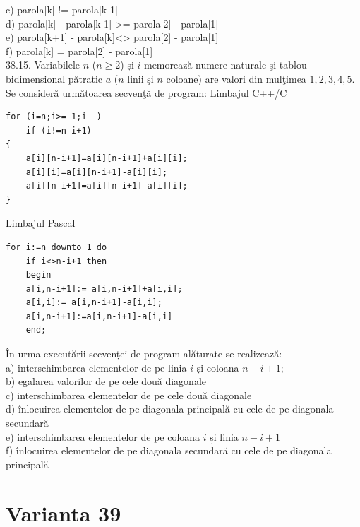 \begin{itemize}
\begin{enumerate}
c) parola[k] != parola[k-1]
\\
d) parola[k] - parola[k-1] >= parola[2] - parola[1]
\\
e) parola[k+1] - parola[k]<> parola[2] - parola[1]
\\
f) parola[k] = parola[2] - parola[1]
\\
38.15. Variabilele $n$ ($n \geq 2$) și $i$ memorează numere naturale şi tablou bidimensional pătratic $a$ ($n$ linii şi $n$ coloane) are valori din mulţimea ${1,2,3,4,5}$. Se consideră următoarea secvenţă de program:
Limbajul C++/C
\begin{verbatim}
for (i=n;i>= 1;i--)
    if (i!=n-i+1)
{
    a[i][n-i+1]=a[i][n-i+1]+a[i][i];
    a[i][i]=a[i][n-i+1]-a[i][i];
    a[i][n-i+1]=a[i][n-i+1]-a[i][i];
}
\end{verbatim}
Limbajul Pascal
\begin{verbatim}
for i:=n downto 1 do
    if i<>n-i+1 then
    begin
    a[i,n-i+1]:= a[i,n-i+1]+a[i,i];
    a[i,i]:= a[i,n-i+1]-a[i,i];
    a[i,n-i+1]:=a[i,n-i+1]-a[i,i]
    end;
\end{verbatim}
În urma executării secvenței de program alăturate se realizează:
\\
a) interschimbarea elementelor de pe linia $i$ și coloana $n-i+1$;
\\
b) egalarea valorilor de pe cele două diagonale
\\
c) interschimbarea elementelor de pe cele două diagonale
\\
d) înlocuirea elementelor de pe diagonala principală cu cele de pe diagonala secundară
\\
e) interschimbarea elementelor de pe coloana $i$ și linia $n-i+1$
\\
f) înlocuirea elementelor de pe diagonala secundară cu cele de pe diagonala principală
\\

\section*{Varianta 39}


\end{enumerate}
\end{itemize}
